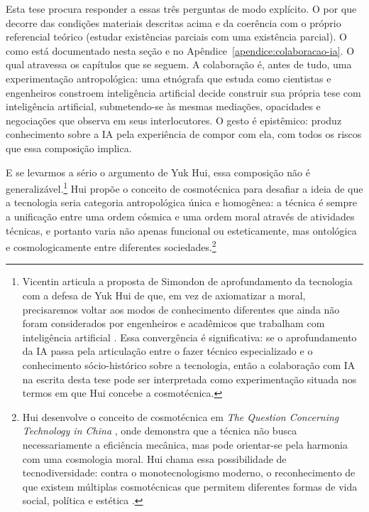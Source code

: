 Esta tese procura responder a essas três perguntas de modo explícito. O por que decorre das condições materiais descritas acima e da coerência com o próprio referencial teórico (estudar existências parciais com uma existência parcial). O como está documentado nesta seção e no Apêndice~\ref{apendice:colaboracao-ia}. O qual atravessa os capítulos que se seguem. A colaboração é, antes de tudo, uma experimentação antropológica: uma etnógrafa que estuda como cientistas e engenheiros constroem inteligência artificial decide construir sua própria tese com inteligência artificial, submetendo-se às mesmas mediações, opacidades e negociações que observa em seus interlocutores. O gesto é epistêmico: produz conhecimento sobre a IA pela experiência de compor com ela, com todos os riscos que essa composição implica.

E se levarmos a sério o argumento de Yuk Hui, essa composição não é generalizável.\footnote{Vicentin articula a proposta de Simondon de aprofundamento da tecnologia com a defesa de Yuk Hui de que, em vez de axiomatizar a moral, precisaremos voltar aos modos de conhecimento diferentes que ainda não foram considerados por engenheiros e acadêmicos que trabalham com inteligência artificial \parencite[p. 186]{hui2020tecnodiversidade}. Essa convergência é significativa: se o aprofundamento da IA passa pela articulação entre o fazer técnico especializado e o conhecimento sócio-histórico sobre a tecnologia, então a colaboração com IA na escrita desta tese pode ser interpretada como experimentação situada nos termos em que Hui concebe a cosmotécnica.} Hui propõe o conceito de cosmotécnica para desafiar a ideia de que a tecnologia seria categoria antropológica única e homogênea: a técnica é sempre a unificação entre uma ordem cósmica e uma ordem moral através de atividades técnicas, e portanto varia não apenas funcional ou esteticamente, mas ontológica e cosmologicamente entre diferentes sociedades.\footnote{Hui desenvolve o conceito de cosmotécnica em \textit{The Question Concerning Technology in China} \parencite{hui2016china}, onde demonstra que a técnica não busca necessariamente a eficiência mecânica, mas pode orientar-se pela harmonia com uma cosmologia moral. Hui chama essa possibilidade de tecnodiversidade: contra o monotecnologismo moderno, o reconhecimento de que existem múltiplas cosmotécnicas que permitem diferentes formas de vida social, política e estética \parencite{hui2020tecnodiversidade}.}

